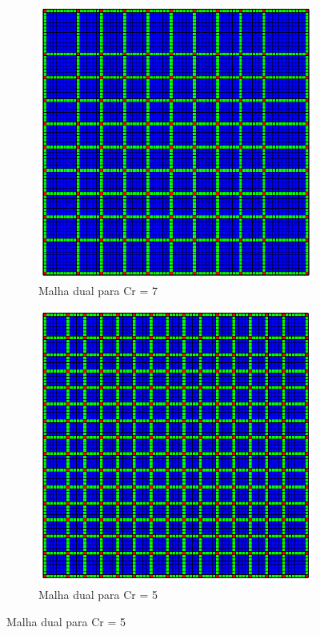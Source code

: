 \documentclass[professionalfont]{beamer}
\begin{document}
\begin{frame}{\FrameProblemName}
    \begin{figure}
        \caption{Malha dual}
        \centering
        \begin{subfigure}{.48\textwidth}
            \centering
            \includegraphics[scale=0.25]{imgs/dual_pr4_cr7.png}
            \caption{Malha dual para Cr = 7}
        \end{subfigure}
        \hspace{\fill}
        \begin{subfigure}{.48\textwidth}
            \centering
            \includegraphics[scale=0.25]{imgs/dual_pr4_cr5.png}
            \caption{Malha dual para Cr = 5}
        \end{subfigure}
    \end{figure}
\end{frame}
\end{document}
